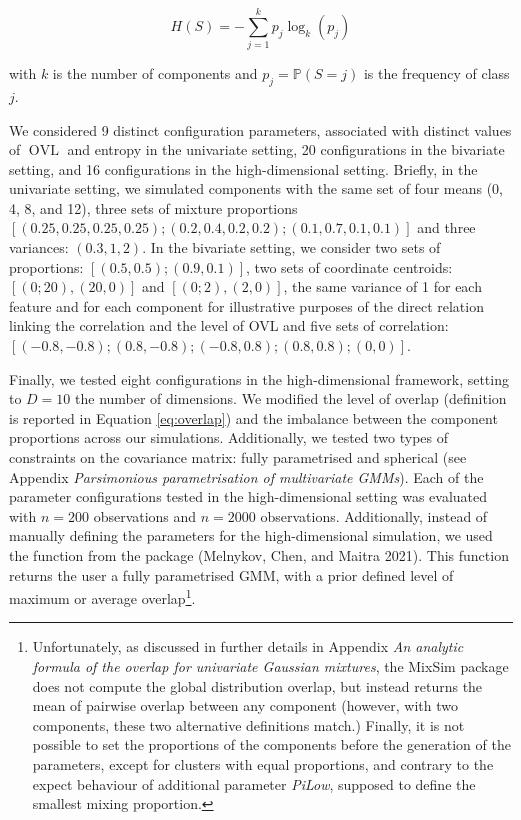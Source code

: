\begin{equation}
    H(S)=-\sum_{j=1}^k p_j \log_k (p_j)
\label{eq:entropy}
\end{equation}

with \(k\) is the number of components and \(p_j=\mathbb{P}(S=j)\) is the frequency of class \(j\).

We considered 9 distinct configuration parameters, associated with distinct values of \(\operatorname{OVL}\) and entropy in the univariate setting, 20 configurations in the bivariate setting, and 16 configurations in the high-dimensional setting. Briefly, in the univariate setting, we simulated components with the same set of four means (0, 4, 8, and 12), three sets of mixture proportions \(\left[(0.25, 0.25, 0.25, 0.25); (0.2, 0.4, 0.2, 0.2); (0.1, 0.7, 0.1, 0.1) \right]\) and three variances: \((0.3, 1, 2)\). In the bivariate setting, we consider two sets of proportions: \(\left[(0.5, 0.5); (0.9, 0.1) \right]\), two sets of coordinate centroids: \(\left[(0; 20), (20, 0) \right]\) and \(\left[(0; 2), (2, 0) \right]\), the same variance of 1 for each feature and for each component for illustrative purposes of the direct relation linking the correlation and the level of OVL and five sets of correlation:\([(-0.8, -0.8); (0.8, -0.8); (-0.8, 0.8); (0.8, 0.8); (0, 0)]\).

Finally, we tested eight configurations in the high-dimensional framework, setting to \(D=10\) the number of dimensions. We modified the level of overlap (definition is reported in Equation \eqref{eq:overlap}) and the imbalance between the component proportions across our simulations. Additionally, we tested two types of constraints on the covariance matrix: fully parametrised and spherical (see Appendix \emph{Parsimonious parametrisation of multivariate GMMs}). Each of the parameter configurations tested in the high-dimensional setting was evaluated with \(n=200\) observations and \(n=2000\) observations. Additionally, instead of manually defining the parameters for the high-dimensional simulation, we used the  function from the  package (Melnykov, Chen, and Maitra 2021). This function returns the user a fully parametrised GMM, with a prior defined level of maximum or average overlap\footnote{Unfortunately, as discussed in further details in Appendix \emph{An analytic formula of the overlap for univariate Gaussian mixtures}, the MixSim package does not compute the global distribution overlap, but instead returns the mean of pairwise overlap between any component (however, with two components, these two alternative definitions match.) Finally, it is not possible to set the proportions of the components before the generation of the parameters, except for clusters with equal proportions, and contrary to the expect behaviour of additional parameter \emph{PiLow}, supposed to define the smallest mixing proportion.}.


